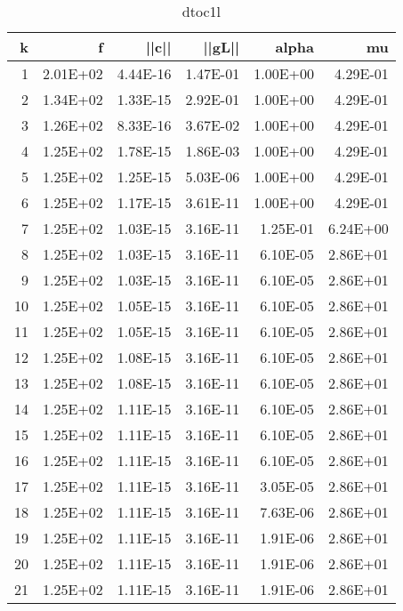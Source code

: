\documentclass[12pt]{article}
\begin{document}
\begin{table}[htbp]
  \centering
  \caption{dtoc1l}
    \begin{tabular}{rrrrrr}
    \toprule
    k     & f     & ||c|| & ||gL||   & alpha & mu \\
    \midrule
    1     & 2.01E+02 & 4.44E-16 & 1.47E-01 & 1.00E+00 & 4.29E-01 \\
    2     & 1.34E+02 & 1.33E-15 & 2.92E-01 & 1.00E+00 & 4.29E-01 \\
    3     & 1.26E+02 & 8.33E-16 & 3.67E-02 & 1.00E+00 & 4.29E-01 \\
    4     & 1.25E+02 & 1.78E-15 & 1.86E-03 & 1.00E+00 & 4.29E-01 \\
    5     & 1.25E+02 & 1.25E-15 & 5.03E-06 & 1.00E+00 & 4.29E-01 \\
    6     & 1.25E+02 & 1.17E-15 & 3.61E-11 & 1.00E+00 & 4.29E-01 \\
    7     & 1.25E+02 & 1.03E-15 & 3.16E-11 & 1.25E-01 & 6.24E+00 \\
    8     & 1.25E+02 & 1.03E-15 & 3.16E-11 & 6.10E-05 & 2.86E+01 \\
    9     & 1.25E+02 & 1.03E-15 & 3.16E-11 & 6.10E-05 & 2.86E+01 \\
    10    & 1.25E+02 & 1.05E-15 & 3.16E-11 & 6.10E-05 & 2.86E+01 \\
    11    & 1.25E+02 & 1.05E-15 & 3.16E-11 & 6.10E-05 & 2.86E+01 \\
    12    & 1.25E+02 & 1.08E-15 & 3.16E-11 & 6.10E-05 & 2.86E+01 \\
    13    & 1.25E+02 & 1.08E-15 & 3.16E-11 & 6.10E-05 & 2.86E+01 \\
    14    & 1.25E+02 & 1.11E-15 & 3.16E-11 & 6.10E-05 & 2.86E+01 \\
    15    & 1.25E+02 & 1.11E-15 & 3.16E-11 & 6.10E-05 & 2.86E+01 \\
    16    & 1.25E+02 & 1.11E-15 & 3.16E-11 & 6.10E-05 & 2.86E+01 \\
    17    & 1.25E+02 & 1.11E-15 & 3.16E-11 & 3.05E-05 & 2.86E+01 \\
    18    & 1.25E+02 & 1.11E-15 & 3.16E-11 & 7.63E-06 & 2.86E+01 \\
    19    & 1.25E+02 & 1.11E-15 & 3.16E-11 & 1.91E-06 & 2.86E+01 \\
    20    & 1.25E+02 & 1.11E-15 & 3.16E-11 & 1.91E-06 & 2.86E+01 \\
    21    & 1.25E+02 & 1.11E-15 & 3.16E-11 & 1.91E-06 & 2.86E+01 \\

\end{tabular}
\end{table}
\end{document}
